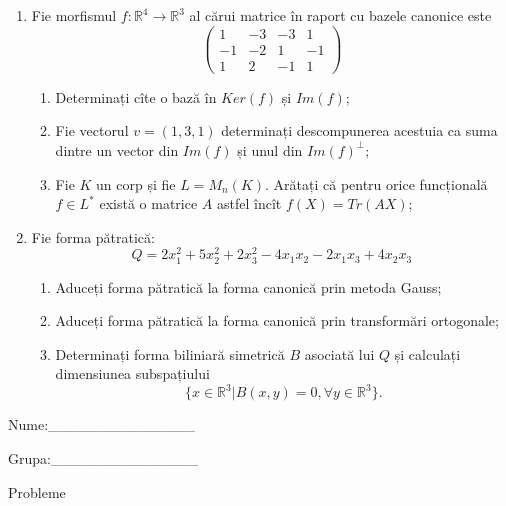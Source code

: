 \documentclass{article}
\begin{document}
\begin{enumerate}
 \item Fie morfismul $f:\mathbb{R}^4 \to \mathbb{R}^3$ al cărui matrice în raport cu bazele canonice este
$$\begin{pmatrix}
1&-3&-3&1\\
-1&-2&1&-1\\
1&2&-1&1
\end{pmatrix}$$

\begin{enumerate}
\item Determinați cîte o bază în $Ker(f)$ și $Im(f)$;
\item Fie vectorul $v=(1,3,1)$ determinați descompunerea acestuia ca suma dintre un vector din $Im(f)$ și unul din $Im(f)^\perp$;
\item Fie $K$ un corp și fie $L=M_n(K)$. Arătați că pentru orice funcțională $f \in L^*$ există o matrice $A$ astfel încît $f(X)=Tr(AX)$;
\end{enumerate}
\item Fie forma pătratică:
$$Q= 2x_1^2+5x_2^2+2x_3^2-4x_1x_2-2x_1x_3+4x_2x_3$$

\begin{enumerate}
\item Aduceți forma pătratică la forma canonică prin metoda Gauss;
\item Aduceți forma pătratică la forma canonică prin transformări ortogonale;
\item Determinați forma biliniară simetrică $B$ asociată lui $Q$ și calculați dimensiunea subspațiului
$$\{x \in \mathbb{R}^3 | B(x,y)=0,\forall y \in \mathbb{R}^3\}.$$

\end{enumerate}
\end{enumerate}
\newpage
\begin{flushright}
Nume:\_\_\_\_\_\_\_\_\_\_\_\_\_\_
 
 
Grupa:\_\_\_\_\_\_\_\_\_\_\_\_\_\_
\end{flushright}
\begin{center}
\vspace{2cm}
{\Large Probleme}
\vspace{2cm}
\end{center}
\end{document}
